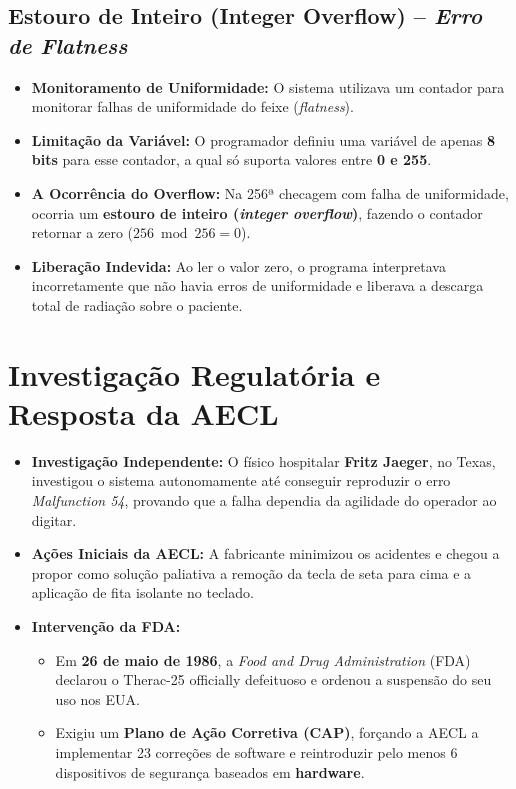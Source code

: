 \documentclass[12pt, a4paper]{article}
\begin{document}
\subsection{Estouro de Inteiro (Integer Overflow) -- \textit{Erro de Flatness}}
\begin{itemize}
    \item \textbf{Monitoramento de Uniformidade:} O sistema utilizava um contador para monitorar falhas de uniformidade do feixe (\textit{flatness}).
    \item \textbf{Limitação da Variável:} O programador definiu uma variável de apenas \textbf{8 bits} para esse contador, a qual só suporta valores entre \textbf{0 e 255}.
    \item \textbf{A Ocorrência do Overflow:} Na 256ª checagem com falha de uniformidade, ocorria um \textbf{estouro de inteiro (\textit{integer overflow})}, fazendo o contador retornar a zero ($256 \bmod 256 = 0$).
    \item \textbf{Liberação Indevida:} Ao ler o valor zero, o programa interpretava incorretamente que não havia erros de uniformidade e liberava a descarga total de radiação sobre o paciente.
\end{itemize}

\section{Investigação Regulatória e Resposta da AECL}

\begin{itemize}
    \item \textbf{Investigação Independente:} O físico hospitalar \textbf{Fritz Jaeger}, no Texas, investigou o sistema autonomamente até conseguir reproduzir o erro \textit{Malfunction 54}, provando que a falha dependia da agilidade do operador ao digitar.
    \item \textbf{Ações Iniciais da AECL:} A fabricante minimizou os acidentes e chegou a propor como solução paliativa a remoção da tecla de seta para cima e a aplicação de fita isolante no teclado.
    \item \textbf{Intervenção da FDA:}
    \begin{itemize}
        \item Em \textbf{26 de maio de 1986}, a \textit{Food and Drug Administration} (FDA) declarou o Therac-25 officially defeituoso e ordenou a suspensão do seu uso nos EUA.
        \item Exigiu um \textbf{Plano de Ação Corretiva (CAP)}, forçando a AECL a implementar 23 correções de software e reintroduzir pelo menos 6 dispositivos de segurança baseados em \textbf{hardware}.
    \end{itemize}
\end{itemize}
\end{document}
